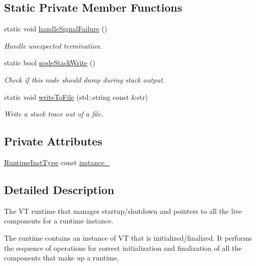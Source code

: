 \subsection*{Static Private Member Functions}
\begin{DoxyCompactItemize}
\item 
static void \hyperlink{structvt_1_1runtime_1_1_runtime_a0ac4eb5f200bc06c59868ec58dee508d}{handle\+Signal\+Failure} ()
\begin{DoxyCompactList}\small\item\em Handle unexpected termination. \end{DoxyCompactList}\item 
static bool \hyperlink{structvt_1_1runtime_1_1_runtime_aa9759e29e6159ac0d84c60dd609cbcad}{node\+Stack\+Write} ()
\begin{DoxyCompactList}\small\item\em Check if this node should dump during stack output. \end{DoxyCompactList}\item 
static void \hyperlink{structvt_1_1runtime_1_1_runtime_a2ebba5dbe6d948d441311778b94a9f3d}{write\+To\+File} (std\+::string const \&str)
\begin{DoxyCompactList}\small\item\em Write a stack trace out of a file. \end{DoxyCompactList}\end{DoxyCompactItemize}
\subsection*{Private Attributes}
\begin{DoxyCompactItemize}
\item 
\hyperlink{namespacevt_1_1runtime_afca910c1b38b3975f7c1da8001a77d58}{Runtime\+Inst\+Type} const \hyperlink{structvt_1_1runtime_1_1_runtime_a1992e655c80324668af6b973b2cbd62b}{instance\+\_\+}
\end{DoxyCompactItemize}


\subsection{Detailed Description}
The VT runtime that manages startup/shutdown and pointers to all the live components for a runtime instance. 

The runtime contains an instance of VT that is initialized/finalized. It performs the sequence of operations for correct initialization and finalization of all the components that make up a runtime.

